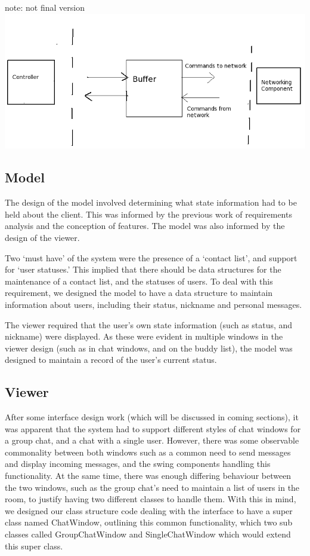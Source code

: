 note: not final version
\includegraphics[scale=0.65]{chapter2/diagrams/buffer.png}

\subsection {Model}

The design of the model involved determining what state information had to be held about the client. This was informed by the previous work of requirements analysis and the conception of features. The model was also informed by the design of the viewer.

Two ‘must have’ of the system were the presence of a ‘contact list’, and support for ‘user statuses.’ This implied that there should be data structures for the maintenance of a contact list, and the statuses of users. To deal with this requirement, we designed the model to have a data structure to maintain information about users, including their status, nickname and personal messages. 

The viewer required that the user’s own state information (such as status, and nickname) were displayed. As these were evident in multiple windows in the viewer design (such as in chat windows, and on the buddy list), the model was designed to maintain a record of the user’s current status. 

\subsection {Viewer}

After some interface design work (which will be discussed in coming sections), it was apparent that the system had to support different styles of chat windows for a group chat, and a chat with a single user. However, there was some observable commonality between both windows such as a common need to send messages and display incoming messages, and the swing components handling this functionality. At the same time, there was enough differing behaviour between the two windows, such as the group chat’s need to maintain a list of users in the room, to justify having two different classes to handle them. With this in mind, we designed our class structure code dealing with the interface to have a super class named ChatWindow, outlining this common functionality, which two sub classes called GroupChatWindow and SingleChatWindow which would extend this super class. 

